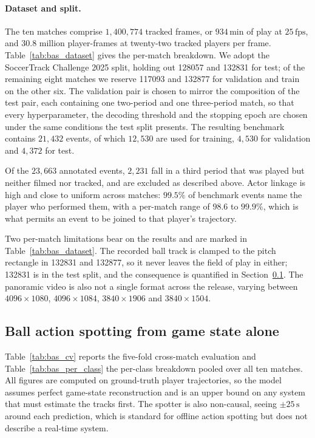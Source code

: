 \paragraph{Dataset and split.}
The ten matches comprise $1{,}400{,}774$ tracked frames, or $934\,\text{min}$ of play at
$25\,\text{fps}$, and $30.8$ million player-frames at twenty-two tracked players per frame.
Table~\ref{tab:bas_dataset} gives the per-match breakdown. We adopt the SoccerTrack Challenge
2025 split, holding out 128057 and 132831 for test; of the remaining eight matches we reserve
117093 and 132877 for validation and train on the other six. The validation pair is chosen to
mirror the composition of the test pair, each containing one two-period and one three-period
match, so that every hyperparameter, the decoding threshold and the stopping epoch are chosen
under the same conditions the test split presents. The resulting benchmark contains $21{,}432$
events, of which $12{,}530$ are used for training, $4{,}530$ for validation and $4{,}372$ for
test.

Of the $23{,}663$ annotated events, $2{,}231$ fall in a third period that was played but
neither filmed nor tracked, and are excluded as described above. Actor linkage is high and
close to uniform across matches: $99.5\%$ of benchmark events name the player who performed
them, with a per-match range of $98.6$ to $99.9\%$, which is what permits an event to be
joined to that player's trajectory.

Two per-match limitations bear on the results and are marked in
Table~\ref{tab:bas_dataset}. The recorded ball track is clamped to the pitch rectangle in
132831 and 132877, so it never leaves the field of play in either; 132831 is in the test
split, and the consequence is quantified in Section~\ref{subsec:bas_results}. The panoramic
video is also not a single format across the release, varying between
$4096\times1080$, $4096\times1084$, $3840\times1906$ and $3840\times1504$.



\subsection{Ball action spotting from game state alone}
\label{subsec:bas_results}

Table~\ref{tab:bas_cv} reports the five-fold cross-match evaluation and
Table~\ref{tab:bas_per_class} the per-class breakdown pooled over all ten matches. All
figures are computed on ground-truth player trajectories, so the model assumes perfect
game-state reconstruction and is an upper bound on any system that must estimate the tracks
first. The spotter is also non-causal, seeing $\pm 25\,\text{s}$ around each prediction, which
is standard for offline action spotting but does not describe a real-time system.

